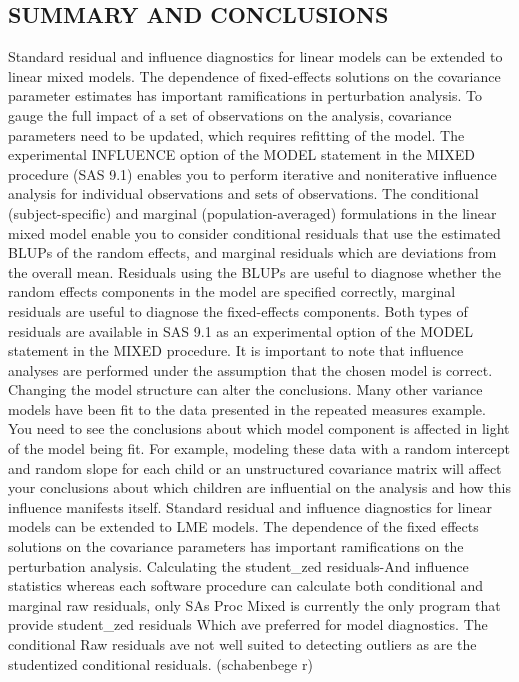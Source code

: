 \documentclass[]{article}
\begin{document}
\subsection*{SUMMARY AND CONCLUSIONS}
Standard residual and influence diagnostics for linear models can be extended to linear mixed models. The
dependence of fixed-effects solutions on the covariance parameter estimates has important ramifications
in perturbation analysis. To gauge the full impact of a set of observations on the analysis, covariance
parameters need to be updated, which requires refitting of the model. The experimental INFLUENCE
option of the MODEL statement in the MIXED procedure (SAS 9.1) enables you to perform iterative and
noniterative influence analysis for individual observations and sets of observations.
The conditional (subject-specific) and marginal (population-averaged) formulations in the linear mixed model
enable you to consider conditional residuals that use the estimated BLUPs of the random effects, and
marginal residuals which are deviations from the overall mean. Residuals using the BLUPs are useful to
diagnose whether the random effects components in the model are specified correctly, marginal residuals
are useful to diagnose the fixed-effects components. Both types of residuals are available in SAS 9.1 as an
experimental option of the MODEL statement in the MIXED procedure.
It is important to note that influence analyses are performed under the assumption that the chosen model
is correct. Changing the model structure can alter the conclusions. Many other variance models have been
fit to the data presented in the repeated measures example. You need to see the conclusions about which
model component is affected in light of the model being fit. For example, modeling these data with a random
intercept and random slope for each child or an unstructured covariance matrix will affect your conclusions
about which children are influential on the analysis and how this influence manifests itself.
Standard residual and influence diagnostics for linear models can be extended to LME models.
The dependence of the fixed effects solutions on the covariance parameters has important ramifications on the perturbation analysis.	
Calculating the student_zed residuals-And influence statistics whereas each software procedure can calculate both conditional and marginal raw residuals, only SAs Proc Mixed is currently the only program that provide student_zed residuals Which ave preferred for model diagnostics. The conditional Raw residuals ave not well suited to detecting outliers as are the studentized conditional residuals. (schabenbege r)
 
\end{document}
